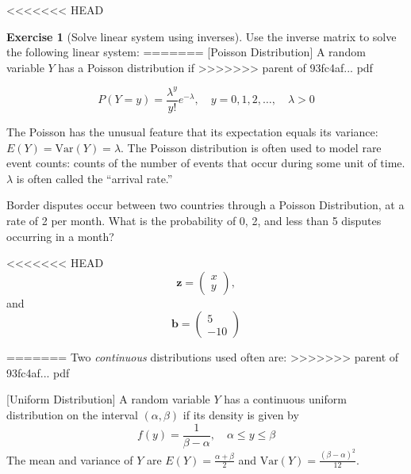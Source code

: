 \documentclass[]{book}
\theoremstyle{definition}
\theoremstyle{definition}
\theoremstyle{definition}
\newtheorem{exercise}{Exercise}[chapter]
\theoremstyle{remark}
\begin{document}
<<<<<<< HEAD
\begin{exercise}[Solve linear system using inverses]
\protect\hypertarget{exr:invlinsys}{}{\label{exr:invlinsys} {} }
Use the inverse matrix to solve the following linear system:
=======
[Poisson Distribution]
\protect\hypertarget{def:unnamed-chunk-89}{}{\label{def:unnamed-chunk-89} {} }A random variable \(Y\) has a Poisson distribution if
>>>>>>> parent of 93fc4af... pdf

\[P(Y = y)=\frac{\lambda^y}{y!}e^{-\lambda}, \quad y=0,1,2,\ldots, \quad \lambda>0\]

The Poisson has the unusual feature that its expectation equals its variance: \(E(Y)=\text{Var}(Y)=\lambda\). The Poisson distribution is often used to model rare event counts: counts of the number of events that occur during some unit of time. \(\lambda\) is often called the ``arrival rate.''

\protect\hypertarget{exm:unnamed-chunk-90}{}{\label{exm:unnamed-chunk-90} }Border disputes occur between two countries through a Poisson Distribution, at a rate of 2 per month. What is the probability of 0, 2, and less than 5 disputes occurring in a month?

<<<<<<< HEAD
\[\textbf{z} = \begin{pmatrix} x\\y \end{pmatrix},\]
and
\[\textbf{b} = \begin{pmatrix} 5\\-10 \end{pmatrix}\]
\end{exercise}
=======
Two \emph{continuous} distributions used often are:
>>>>>>> parent of 93fc4af... pdf

[Uniform Distribution]
\protect\hypertarget{def:unnamed-chunk-91}{}{\label{def:unnamed-chunk-91} {} }A random variable \(Y\) has a continuous uniform distribution on the interval \((\alpha,\beta)\) if its density is given by \[f(y)=\frac{1}{\beta-\alpha}, \quad \alpha\le y\le \beta\] The mean and variance of \(Y\) are \(E(Y)=\frac{\alpha+\beta}{2}\) and \(\text{Var}(Y)=\frac{(\beta-\alpha)^2}{12}\).
\end{document}
